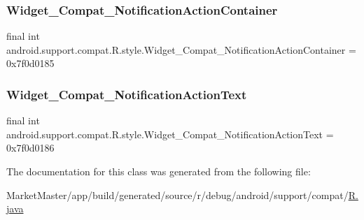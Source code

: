 \subsubsection{\texorpdfstring{Widget\+\_\+\+Compat\+\_\+\+Notification\+Action\+Container}{Widget\_Compat\_NotificationActionContainer}}
{\footnotesize\ttfamily final int android.\+support.\+compat.\+R.\+style.\+Widget\+\_\+\+Compat\+\_\+\+Notification\+Action\+Container = 0x7f0d0185\hspace{0.3cm}{\ttfamily [static]}}

\mbox{\label{classandroid_1_1support_1_1compat_1_1R_1_1style_a96ff4cd097ce36adea6f4badafde3416}} 
\subsubsection{\texorpdfstring{Widget\+\_\+\+Compat\+\_\+\+Notification\+Action\+Text}{Widget\_Compat\_NotificationActionText}}
{\footnotesize\ttfamily final int android.\+support.\+compat.\+R.\+style.\+Widget\+\_\+\+Compat\+\_\+\+Notification\+Action\+Text = 0x7f0d0186\hspace{0.3cm}{\ttfamily [static]}}



The documentation for this class was generated from the following file\+:\begin{DoxyCompactItemize}
\item 
Market\+Master/app/build/generated/source/r/debug/android/support/compat/\mbox{\hyperlink{debug_2android_2support_2compat_2R_8java}{R.\+java}}\end{DoxyCompactItemize}
